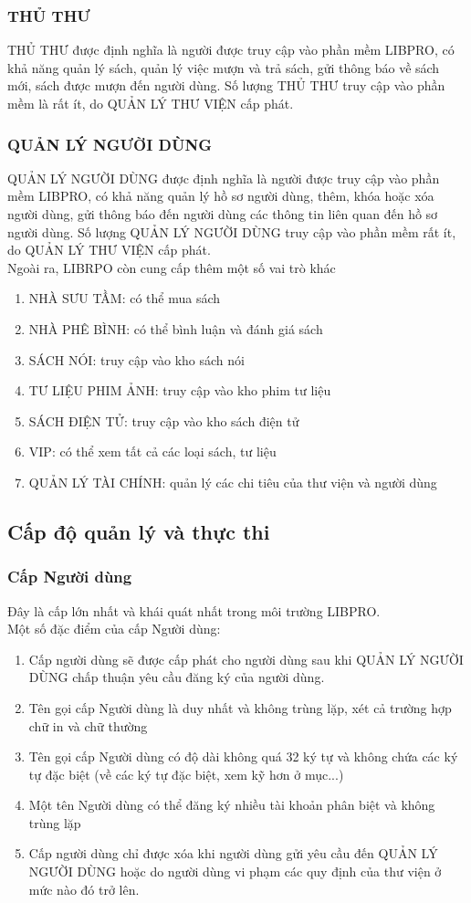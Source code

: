 \documentclass[12pt,a4paper]{report}
\begin{document}
			\subsubsection{THỦ THƯ}
				THỦ THƯ được định nghĩa là người được truy cập vào phần mềm LIBPRO, có khả năng quản lý sách, quản lý việc mượn và trả sách, gửi thông báo về sách mới, sách được mượn đến người dùng.
				Số lượng THỦ THƯ truy cập vào phần mềm là rất ít, do QUẢN LÝ THƯ VIỆN cấp phát.
			\subsubsection{QUẢN LÝ NGƯỜI DÙNG}
				QUẢN LÝ NGƯỜI DÙNG được định nghĩa là người được truy cập vào phần mềm LIBPRO, có khả năng quản lý hồ sơ người dùng, thêm, khóa hoặc xóa người dùng, gửi thông báo đến người dùng các thông tin liên quan đến hồ sơ người dùng.
				Số lượng QUẢN LÝ NGƯỜI DÙNG truy cập vào phần mềm rất ít, do QUẢN LÝ THƯ VIỆN cấp phát.\\
		Ngoài ra, LIBRPO còn cung cấp thêm một số vai trò khác
		\begin{enumerate}
			\item NHÀ SƯU TẦM: có thể mua sách
			\item NHÀ PHÊ BÌNH: có thể bình luận và đánh giá sách
			\item SÁCH NÓI: truy cập vào kho sách nói
			\item TƯ LIỆU PHIM ẢNH: truy cập vào kho phim tư liệu
			\item SÁCH ĐIỆN TỬ: truy cập vào kho sách điện tử
			\item VIP: có thể xem tất cả các loại sách, tư liệu
			\item QUẢN LÝ TÀI CHÍNH: quản lý các chi tiêu của thư viện và người dùng
		\end{enumerate}
		\subsection{Cấp độ quản lý và thực thi}
			\subsubsection{Cấp Người dùng}
			Đây là cấp lớn nhất và khái quát nhất trong môi trường LIBPRO.\\
			Một số đặc điểm của cấp Người dùng:
			\begin{enumerate}
				\item Cấp người dùng sẽ được cấp phát cho người dùng sau khi QUẢN LÝ NGƯỜI DÙNG chấp thuận yêu cầu đăng ký của người dùng.
				\item Tên gọi cấp Người dùng là duy nhất và không trùng lặp, xét cả trường hợp chữ in và chữ thường
				\item Tên gọi cấp Người dùng có độ dài không quá 32 ký tự và không chứa các ký tự đặc biệt (về các ký tự đặc biệt, xem kỹ hơn ở mục...)
				\item Một tên Người dùng có thể đăng ký nhiều tài khoản phân biệt và không trùng lặp
				\item Cấp người dùng chỉ được xóa khi người dùng gửi yêu cầu đến QUẢN LÝ NGƯỜI DÙNG hoặc do người dùng vi phạm các quy định của thư viện ở mức nào đó trở lên.
			\end{enumerate}
\end{document}
